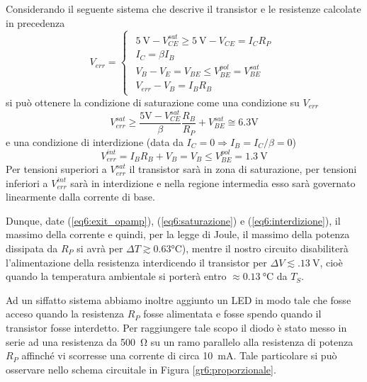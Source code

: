 Considerando il seguente sistema che descrive il transistor e le resistenze calcolate in precedenza
$$
V_{err} = \begin{cases}
\begin{array}{rl}
\SI{5}{\volt}-V_{CE}^{sat} \geq \SI{5}{\volt}-V_{CE} = I_{C}R_P\\
I_C=\beta I_B \\
V_B - V_E = V_{BE} \leq V_{BE}^{pol} = V_{BE}^{sat}\\
V_{err}-V_B=I_B R_B
\end{array}
\end{cases}
$$
si può ottenere la condizione di saturazione come una condizione su $V_{err}$
\begin{equation}
V_{err}^{sat} \geq \frac{5\si{\volt}-V_{CE}^{sat}}{\beta} \frac{R_B}{R_P}+V_{BE}^{sat} \cong 6.3 \si{\volt}
\label{eq6:saturazione}
\end{equation}
e una condizione di interdizione (data da $I_C = 0 \Rightarrow I_B = I_C / \beta = 0$)
\begin{equation}
V_{err}^{int} = I_B R_B + V_B = V_B \leq V_{BE}^{pol} = \SI{1.3}{\V}
\label{eq6:interdizione}
\end{equation}
Per tensioni superiori a $V_{err}^{sat}$ il transistor sarà in zona di saturazione, per tensioni inferiori a $V_{err}^{int}$ sarà in interdizione e nella regione intermedia esso sarà governato linearmente dalla corrente di base.

Dunque, date (\ref{eq6:exit_opamp}), (\ref{eq6:saturazione}) e (\ref{eq6:interdizione}), il massimo della corrente e quindi, per la legge di Joule, il massimo della potenza dissipata da $R_P$ si avrà per $\Delta T \gtrsim 0.63 \si{\celsius}$), mentre il nostro circuito disabiliterà l'alimentazione della resistenza interdicendo il transistor per $\Delta V \lesssim \SI{.13}{\V}$, cioè quando la temperatura ambientale si porterà entro $\approx \SI{0.13}{\celsius}$ da $T_{S}$.


Ad un siffatto sistema abbiamo inoltre aggiunto un LED in modo tale che fosse acceso quando la resistenza $R_P$ fosse alimentata e fosse spendo quando il transistor fosse interdetto.
Per raggiungere tale scopo il diodo è stato messo in serie ad una resistenza da \SI{500}{\ohm} su un ramo parallelo alla resistenza di potenza $R_P$ affinché vi scorresse una corrente di circa \SI{10}{\mA}.
Tale particolare si può osservare nello schema circuitale in Figura \ref{gr6:proporzionale}.

